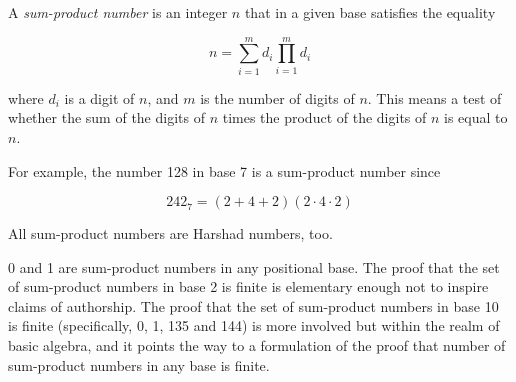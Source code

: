 \documentclass[12pt]{article}
\begin{document}
A \emph{sum-product number} is an integer $n$ that in a given base satisfies the equality

$$n = \sum_{i = 1}^m d_i \prod_{i = 1}^m d_i$$

where $d_i$ is a digit of $n$, and $m$ is the number of digits of $n$. This means a test of whether the sum of the digits of $n$ times the product of the digits of $n$ is equal to $n$.

For example, the number 128 in base 7 is a sum-product number since

$$242_7 = (2 + 4 + 2)(2 \cdot 4 \cdot 2)$$

All sum-product numbers are Harshad numbers, too.

0 and 1 are sum-product numbers in any positional base. The proof that the set of sum-product numbers in base 2 is finite is elementary enough not to inspire claims of authorship. The proof that the set of sum-product numbers in base 10 is finite (specifically, 0, 1, 135 and 144) is more involved but within the realm of basic algebra, and it points the way to a formulation of the proof that number of sum-product numbers in any base is finite.
\end{document}
